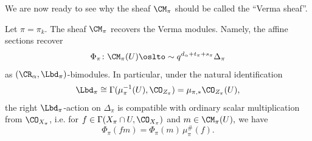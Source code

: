 \documentclass[11pt,reqno]{amsart}
\newcommand{\MHL}[1]{{\color{blue}{MHL: #1}}}
\newcommand{\FZ}[1]{{\color{orange}{FZ: #1}}}
\begin{document}
We are now ready to see why the sheaf $\CM_\pi$ should be called the ``Verma sheaf''.
\begin{theorem}\label{thm:M is Verma on affine}
    Let $\pi=\pi_k$. The sheaf $\CM_{\pi}$ recovers the Verma modules. Namely, the affine sections recover
    \[\Phi_{\pi}\colon\CM_{\pi}(U)\simlto q^{d_\alpha+t_\pi+s_\pi}\Delta_{\pi}\]
    as $(\CR_\alpha,\Lbd_{\pi})$-bimodules.
    In particular, under the natural identification
\[\Lbd_{\pi}\cong \Gamma(\mu_{\pi}^{-1}(U),\CO_{Z_{\pi}})=\mu_{\pi,*}\CO_{Z_\pi}(U),\]the right $\Lbd_{\pi}$-action on $\Delta_{\pi}$ is compatible
with ordinary scalar multiplication from $\CO_{X_{\pi}}$, i.e. for $f\in\Gamma(X_{\pi}\cap U,\CO_{X_{\pi}})$ and $m\in\CM_{\pi}(U),$ we have 
\[
\Phi_{\pi}(fm)=\Phi_{\pi}(m)\,\mu_{\pi}^{\#}(f).\]
\end{theorem}
\end{document}
